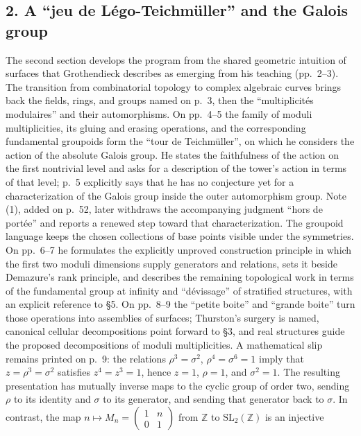 \documentclass[11pt,a4paper]{article}
\begin{document}
\subsection*{2. A ``jeu de Légo-Teichmüller'' and the Galois group}
The second section develops the program from the shared geometric
intuition of surfaces that Grothendieck describes as emerging from his
teaching (pp.~2--3). The transition from combinatorial topology to complex
algebraic curves brings back the fields, rings, and groups named on p.~3,
then the ``multiplicités modulaires'' and their automorphisms. On
pp.~4--5 the family of moduli multiplicities, its gluing and erasing
operations, and the corresponding fundamental groupoids form the
``tour de Teichmüller'', on which he considers the action of the absolute
Galois group. He states the faithfulness of the action on the first
nontrivial level and asks for a description of the tower's action in terms
of that level; p.~5 explicitly says that he has no conjecture yet for a
characterization of the Galois group inside the outer automorphism group.
Note (1), added on p.~52, later withdraws the accompanying judgment
``hors de portée'' and reports a renewed step toward that characterization.
The groupoid language keeps the chosen collections of base points visible
under the symmetries. On pp.~6--7 he formulates the explicitly unproved construction principle
in which the first two moduli dimensions supply generators and relations,
sets it beside Demazure's rank principle, and describes the remaining
topological work in terms of the fundamental group at infinity and
``dévissage'' of stratified structures, with an explicit reference to
\S5. On pp.~8--9 the ``petite boite'' and ``grande boite'' turn those
operations into assemblies of surfaces; Thurston's surgery is named,
canonical cellular decompositions point forward to \S3, and real
structures guide the proposed decompositions of moduli multiplicities.
A mathematical slip remains printed on p.~9: the relations
$\rho^3=\sigma^2$, $\rho^4=\sigma^6=1$ imply that
$z=\rho^3=\sigma^2$ satisfies $z^4=z^3=1$, hence $z=1$,
$\rho=1$, and $\sigma^2=1$. The resulting presentation has mutually
inverse maps to the cyclic group of order two, sending $\rho$ to its
identity and $\sigma$ to its generator, and sending that generator back
to $\sigma$. In contrast, the map
$n\longmapsto M_n=\left(\begin{smallmatrix}1&n\\0&1\end{smallmatrix}\right)$
from $\mathbb Z$ to $\mathrm{SL}_2(\mathbb Z)$ is an injective
\end{document}
